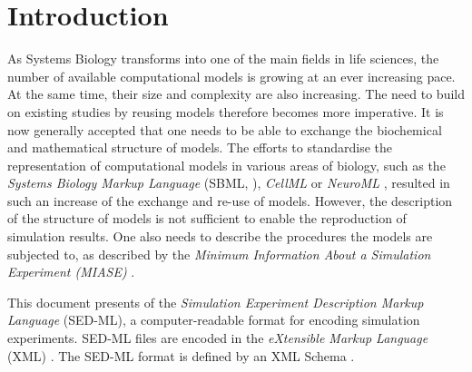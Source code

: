 \chapter{Introduction}

As Systems Biology transforms into one of the main fields in life sciences, the number of available computational models is growing at an ever increasing pace. At the same time, their size and complexity are also increasing. The need to build on existing studies by reusing models therefore becomes more imperative. It is now generally accepted that one needs to be able to exchange the biochemical and mathematical structure of models. The efforts to standardise the representation of computational models in various areas of biology, such as the \emph{Systems Biology Markup Language} (SBML, \citep{Hucka:2003}), \emph{CellML} \citep{Lloyd:2004} or \emph{NeuroML} \citep{Goddard:2001}, resulted in such an increase of the exchange and re-use of models. However, the description of the structure of models is not sufficient to enable the reproduction of simulation results.  One also needs to describe the procedures the models are subjected to, as described by the \emph{Minimum Information About a Simulation Experiment (MIASE)} \citep{Waltemath:2011}. 

This document presents  \LoneVtwo of the \emph{Simulation Experiment Description Markup Language} (SED-ML), a computer-readable format for encoding simulation experiments. SED-ML files are encoded in the \emph{eXtensible Markup Language} (XML) \citep{Bray:2006}. The SED-ML format is defined by an XML Schema \citep{Fallside:2001}. 




